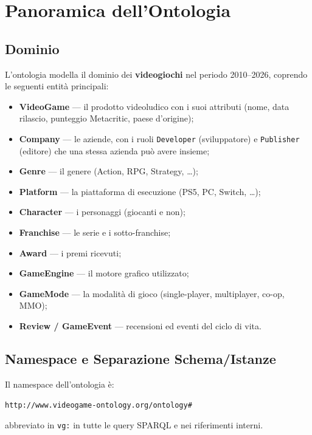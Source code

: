 \section{Panoramica dell'Ontologia}
\label{sec:ontologia_overview}

\subsection{Dominio}

L'ontologia modella il dominio dei \textbf{videogiochi} nel periodo 2010--2026,
coprendo le seguenti entit\`a principali:
\begin{itemize}[nosep]
  \item \textbf{VideoGame} --- il prodotto videoludico con i suoi attributi (nome, data rilascio, punteggio Metacritic, paese d'origine);
  \item \textbf{Company} --- le aziende, con i ruoli \texttt{Developer} (sviluppatore) e \texttt{Publisher} (editore) che una stessa azienda pu\`o avere insieme;
  \item \textbf{Genre} --- il genere (Action, RPG, Strategy, \dots{});
  \item \textbf{Platform} --- la piattaforma di esecuzione (PS5, PC, Switch, \dots{});
  \item \textbf{Character} --- i personaggi (giocanti e non);
  \item \textbf{Franchise} --- le serie e i sotto-franchise;
  \item \textbf{Award} --- i premi ricevuti;
  \item \textbf{GameEngine} --- il motore grafico utilizzato;
  \item \textbf{GameMode} --- la modalit\`a di gioco (single-player, multiplayer, co-op, MMO);
  \item \textbf{Review / GameEvent} --- recensioni ed eventi del ciclo di vita.
\end{itemize}

\subsection{Namespace e Separazione Schema/Istanze}

Il namespace dell'ontologia \`e:
\begin{center}
\texttt{http://www.videogame-ontology.org/ontology\#}
\end{center}
abbreviato in \texttt{vg:} in tutte le query SPARQL e nei riferimenti interni.

